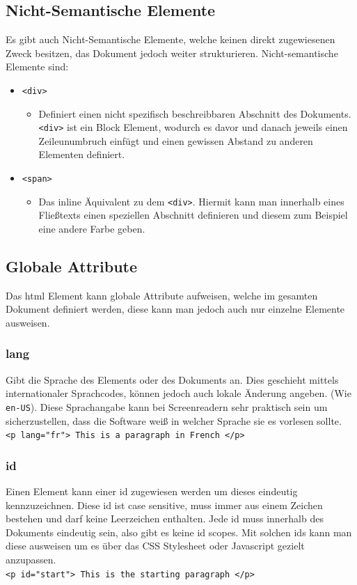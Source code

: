 \documentclass{article}
\begin{document}
	\subsection{Nicht-Semantische Elemente}
	Es gibt auch Nicht-Semantische Elemente, welche keinen direkt zugewiesenen Zweck besitzen, das Dokument jedoch weiter strukturieren. Nicht-semantische Elemente sind:
	\begin{itemize}
		\item{\texttt{<div>}}
		\begin{itemize}
			\item{Definiert einen nicht spezifisch beschreibbaren Abschnitt des Dokuments. \texttt{<div>} ist ein Block Element, wodurch es davor und danach jeweils einen Zeileunumbruch einfügt und einen gewissen Abstand zu anderen Elementen definiert.}
		\end{itemize}
		\item{\texttt{<span>}}
		\begin{itemize}
			\item{Das inline Äquivalent zu dem \texttt{<div>}. Hiermit kann man innerhalb eines Fließtexts einen speziellen Abschnitt definieren und diesem zum Beispiel eine andere Farbe geben.}
		\end{itemize}
	\end{itemize}
	\subsection{Globale Attribute}
	Das html Element kann globale Attribute aufweisen, welche im gesamten Dokument definiert werden, diese kann man jedoch auch nur einzelne Elemente ausweisen.
	\subsubsection{lang}
	Gibt die Sprache des Elements oder des Dokuments an. Dies geschieht mittels internationaler Sprachcodes, können jedoch auch lokale Änderung angeben. (Wie \texttt{en-US}). Diese Sprachangabe kann bei Screenreadern sehr praktisch sein um sicherzustellen, dass die Software weiß in welcher Sprache sie es vorlesen sollte. \\
	\texttt{<p lang="fr"> This is a paragraph in French </p>}
	\subsubsection{id}
	Einen Element kann einer id zugewiesen werden um dieses eindeutig kennzuzeichnen. Diese id ist case sensitive, muss immer aus einem Zeichen bestehen und darf keine Leerzeichen enthalten. Jede id muss innerhalb des Dokuments eindeutig sein, also gibt es keine id scopes. Mit solchen ids kann man diese ausweisen um es über das CSS Stylesheet oder Javascript gezielt anzupassen.\\
	\texttt{<p id="start"> This is the starting paragraph </p>}
\end{document}
